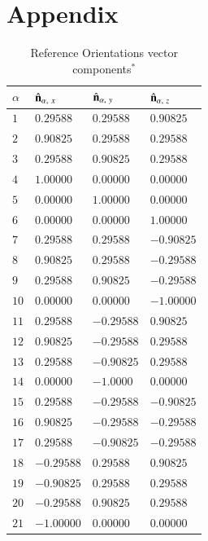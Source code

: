 \documentclass[final,  3p]{elsarticle}
\begin{document}
\section*{Appendix}
\setcounter{table}{0}
\renewcommand{\thetable}{A\arabic{table}}
\begin{table}[h]
\begin{center}
\caption{\label{tab:A1}
%
Reference Orientations vector components$^*$}
\begin{tabularx}{0.65\textwidth}{
		| >{\centering\arraybackslash}X 
		| >{\centering\arraybackslash}X 
		| >{\centering\arraybackslash}X 
		| >{\centering\arraybackslash}X| }
\hline\hline
$\alpha$ & $\hat{\bf n}_{\alpha,\ x}$ & $\hat{\bf n}_{\alpha,\ y}$ &  $\hat{\bf n}_{\alpha,\ z}$ \\
\hline
$1$  & $ 0.29588$ &  $ 0.29588$ & $ 0.90825$ \\
$2$  & $ 0.90825$ &  $ 0.29588$ & $ 0.29588$ \\
$3$  & $ 0.29588$ &  $ 0.90825$ & $ 0.29588$ \\
$4$  & $ 1.00000$ &  $ 0.00000$ & $ 0.00000$ \\
$5$  & $ 0.00000$ &  $ 1.00000$ & $ 0.00000$ \\
$6$  & $ 0.00000$ &  $ 0.00000$ & $ 1.00000$ \\
$7$  & $ 0.29588$ &  $ 0.29588$ & $-0.90825$ \\
$8$  & $ 0.90825$ &  $ 0.29588$ & $-0.29588$ \\
$9$  & $ 0.29588$ &  $ 0.90825$ & $-0.29588$ \\
$10$ & $ 0.00000$ &  $ 0.00000$ & $-1.00000$ \\
$11$ & $ 0.29588$ &  $-0.29588$ & $ 0.90825$ \\
$12$ & $ 0.90825$ &  $-0.29588$ & $ 0.29588$ \\
$13$ & $ 0.29588$ &  $-0.90825$ & $ 0.29588$ \\
$14$ & $ 0.00000$ &  $ -1.0000$ & $ 0.00000$ \\
$15$ & $ 0.29588$ &  $-0.29588$ & $-0.90825$ \\
$16$ & $ 0.90825$ &  $-0.29588$ & $-0.29588$ \\
$17$ & $ 0.29588$ &  $-0.90825$ & $-0.29588$ \\
$18$ & $-0.29588$ &  $ 0.29588$ & $ 0.90825$ \\
$19$ & $-0.90825$ &  $ 0.29588$ & $ 0.29588$ \\
$20$ & $-0.29588$ &  $ 0.90825$ & $ 0.29588$ \\
$21$ & $-1.00000$ &  $ 0.00000$ & $ 0.00000$ \\

\end{tabularx}
\end{center}
\end{table}
\end{document}
